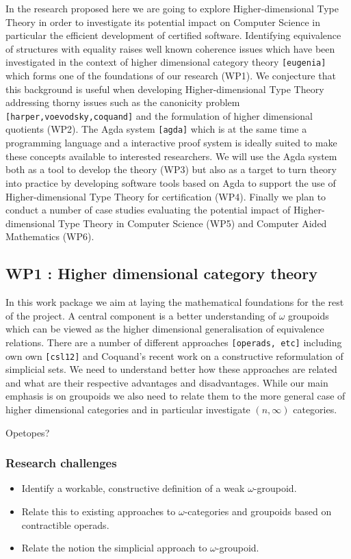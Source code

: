 \documentclass[a4paper]{article}
\renewcommand{\cite}[1]{{\tt[#1]}}
\begin{document}
In the research proposed here we are going to explore
Higher-dimensional Type Theory in order to investigate its potential
impact on Computer Science in particular the efficient development of
certified software. Identifying equivalence of structures with
equality raises well known coherence issues which have been
investigated in the context of higher dimensional category theory
\cite{eugenia} which forms one of the foundations of our research
(WP1). We conjecture that this background is useful when developing
Higher-dimensional Type Theory addressing thorny issues such as the canonicity
problem \cite{harper,voevodsky,coquand} and the formulation of higher
dimensional quotients (WP2). The Agda system \cite{agda} which is at
the same time a programming language and a interactive proof system is
ideally suited to make these concepts available to interested
researchers. We will use the Agda system both as a tool to develop the
theory (WP3) but also as a target to turn theory into practice by
developing software tools based on Agda to support the use of
Higher-dimensional Type Theory for certification (WP4). Finally we plan to
conduct a number of case studies evaluating the potential impact of
Higher-dimensional Type Theory in Computer Science (WP5) and Computer Aided
Mathematics (WP6).

\subsection*{WP1 : Higher dimensional category theory}
\label{sec:wp:qio}

In this work package we aim at laying the mathematical foundations for
the rest of the project. A central component is a better understanding
of $\omega$ groupoids which can be viewed as the higher dimensional
generalisation of equivalence relations. There are a number of
different approaches \cite{operads, etc} including own own
\cite{csl12} and Coquand's recent work on a constructive reformulation
of simplicial sets. We need to understand better how these approaches
are related and what are their respective advantages and
disadvantages. While our main emphasis is on groupoids we also need to
relate them to the more general case of higher dimensional categories
and in particular investigate $(n,\infty)$ categories.

Opetopes?

\subsubsection*{Research challenges}
\label{sec:rsearch-challenges}
\begin{itemize}
\item Identify a workable, constructive definition of a weak
$\omega$-groupoid.
\item Relate this to existing approaches to $\omega$-categories and
  groupoids based on contractible operads.
\item Relate the notion the simplicial approach to $\omega$-groupoid.
\end{itemize}
\end{document}
